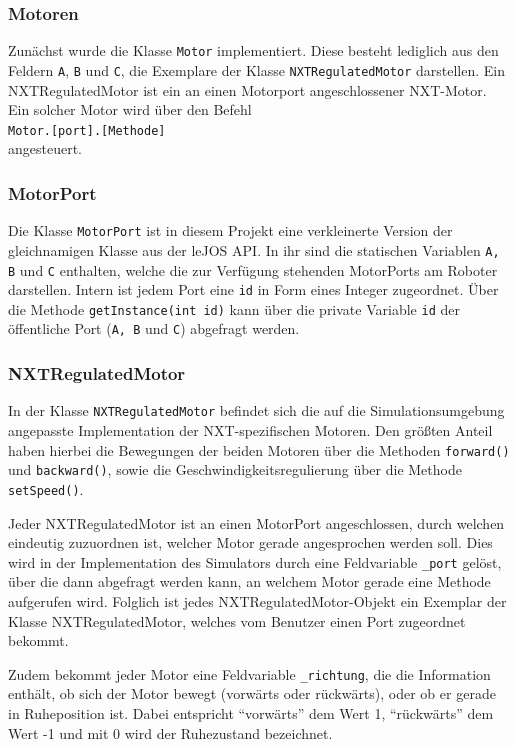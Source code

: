 \documentclass[paper=a4, DIV=calc, BCOR=12mm, twoside=on, onecolumn=on, open = right, titlepage =on, parskip =half-, headsepline = on, footsepline = off, chapterprefix = off, appendixprefix = on, fontsize = 12pt, numbers = noenddot, abstract = on]{scrbook}
\begin{document}
\subsubsection{Motoren}
Zunächst wurde die Klasse \texttt{Motor} implementiert. Diese besteht lediglich aus den Feldern \texttt{A}, \texttt{B} und \texttt{C}, die Exemplare der Klasse \texttt{NXTRegulatedMo\-tor} darstellen. Ein NXTRegulatedMotor ist ein an einen Motorport angeschlossener NXT-Motor. Ein solcher Motor wird über den Befehl\\
\hspace*{2em} \texttt{Motor.[port].[Methode]}\\
angesteuert. 

\subsubsection{MotorPort}
Die Klasse \texttt{MotorPort} ist in diesem Projekt eine verkleinerte Version der gleichnamigen Klasse aus der leJOS API. In ihr sind die statischen Variablen \texttt{A, B} und \texttt{C} enthalten, welche die zur Verfügung stehenden MotorPorts am Roboter darstellen. Intern ist jedem Port eine \texttt{id} in Form eines Integer zugeordnet. Über die Methode \texttt{get\-In\-stance(int id)} kann über die private Variable \texttt{id} der öffentliche Port (\texttt{A, B} und \texttt{C}) abgefragt werden.

\subsubsection{NXTRegulatedMotor}
In der Klasse \texttt{NXTRegulatedMotor} befindet sich die auf die Simulationsumgebung angepasste Implementation der NXT-spezifischen Motoren. Den größten Anteil haben hierbei die Bewegungen der beiden Motoren über die Methoden \texttt{for\-ward()} und \texttt{back\-ward()}, sowie die Geschwindigkeitsregulierung über die Methode \texttt{set\-Speed()}. 

Jeder NXTRegulatedMotor ist an einen MotorPort angeschlossen, durch welchen eindeutig zuzuordnen ist, welcher Motor gerade angesprochen werden soll. Dies wird in der Implementation des Simulators durch eine Feldvariable \texttt{{\_}port} gelöst, über die dann abgefragt werden kann, an welchem Motor gerade eine Methode aufgerufen wird. Folglich ist jedes NXT\-Regulated\-Motor\--Objekt ein Exemplar der Klasse NXTRegulatedMotor, welches vom Benutzer einen Port zugeordnet bekommt.

Zudem bekommt jeder Motor eine Feldvariable \texttt{{\_}richtung}, die die Information enthält, ob sich der Motor bewegt (vorwärts oder rückwärts), oder ob er gerade in Ruheposition ist. Dabei entspricht "`vorwärts"' dem Wert 1, "`rückwärts"' dem Wert -1 und mit 0 wird der Ruhezustand bezeichnet.
\end{document}

